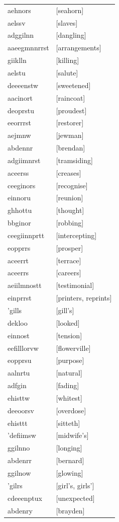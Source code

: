 \documentclass{article}
\begin{document}
\begin{tabular}{ll}
aehnors & [seahorn] \\
aelssv & [slaves] \\
adggilnn & [dangling] \\
aaeegmnnrrst & [arrangements] \\
giiklln & [killing] \\
aelstu & [salute] \\
deeeenstw & [sweetened] \\
aacinort & [raincoat] \\
deoprstu & [proudest] \\
eeorrrst & [restorer] \\
aejmnw & [jewman] \\
abdennr & [brendan] \\
adgiimnrst & [tramsiding] \\
aceerss & [creases] \\
ceeginors & [recognise] \\
einnoru & [reunion] \\
ghhottu & [thought] \\
bbginor & [robbing] \\
ceegiinnprtt & [intercepting] \\
eopprrs & [prosper] \\
aceerrt & [terrace] \\
aceerrs & [careers] \\
aeiilmnostt & [testimonial] \\
einprrst & [printers, reprints] \\
'gills & [gill's] \\
dekloo & [looked] \\
einnost & [tension] \\
eefilllorvw & [flowerville] \\
eopprsu & [purpose] \\
aalnrtu & [natural] \\
adfgin & [fading] \\
ehisttw & [whitest] \\
deeoorsv & [overdose] \\
ehisttt & [sitteth] \\
'defiimsw & [midwife's] \\
ggilnno & [longing] \\
abdenrr & [bernard] \\
ggilnow & [glowing] \\
'gilrs & [girl's, girls'] \\
cdeeenptux & [unexpected] \\
abdenry & [brayden] \\

\end{tabular}
\end{document}
